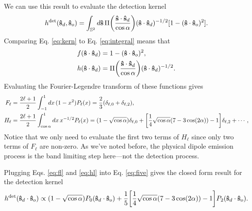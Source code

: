 \documentclass[11pt]{article}
\providecommand{\so}{\mathbf{\hat{s}}_o}
\providecommand{\sd}{\mathbf{\hat{s}}_d}
\providecommand{\mh}[1]{\mathbf{\hat{#1}}}
\providecommand{\mbb}[1]{\mathbb{#1}}
\providecommand{\ints}[1]{\int_{\mbb{S}^{#1}}}
\let\originalleft\left
\let\originalright\right
\renewcommand{\left}{\mathopen{}\mathclose\bgroup\originalleft}
\renewcommand{\right}{\aftergroup\egroup\originalright}
\begin{document}
We can use this result to evaluate the detection kernel
\begin{align}
  h^{\text{det}}(\sd,\so) = \ints{2}d\mh{s}\,\Pi\left(\frac{\mh{s}\cdot\sd}{\cos\alpha}\right)(\mh{s}\cdot\sd)^{-1/2}[1 - (\mh{s}\cdot\so)^2]. \label{eq:kern}
\end{align}
Comparing Eq. \eqref{eq:kern} to Eq. \eqref{eq:integral} means that
\begin{align}
  f(\mh{s}\cdot\sd) &= 1 - (\mh{s}\cdot\so)^2,  \\
  h(\mh{s}\cdot\sd) &= \Pi\left(\frac{\mh{s}\cdot\sd}{\cos\alpha}\right)(\mh{s}\cdot\sd)^{-1/2}.
\end{align}
Evaluating the Fourier-Legendre transform of these functions gives
\begin{align}
  F_\ell &= \frac{2\ell + 1}{2}\int_{-1}^1dx\,(1 - x^{2})P_\ell(x) = \frac{2}{3}(\delta_{\ell,0} + \delta_{\ell,2}),\label{eq:fl}\\
  H_\ell &= \frac{2\ell + 1}{2}\int_{\cos\alpha}^1dx\,x^{-1/2}P_\ell(x) = (1 - \sqrt{\cos\alpha})\delta_{\ell,0} + \left[\frac{1}{4}\sqrt{\cos\alpha}(7-3\cos(2\alpha)) - 1\right]\delta_{\ell,2}+ \cdots,\label{eq:hl}
\end{align}
Notice that we only need to evaluate the first two terms of $H_\ell$ since
only two terms of $F_\ell$ are non-zero. As we've noted before, the physical
dipole emission process is the band limiting step here---not the detection
process.

Plugging Eqs. \eqref{eq:fl} and \eqref{eq:hl} into Eq. \eqref{eq:five} gives the
closed form result for the detection kernel
\begin{align}
  h^{\text{det}}(\sd\cdot\so) \propto (1 - \sqrt{\cos\alpha})P_0(\sd\cdot\so) + \frac{1}{5}\left[\frac{1}{4}\sqrt{\cos\alpha}(7-3\cos(2\alpha)) - 1\right]P_2(\sd\cdot\so).
\end{align}
\end{document}
